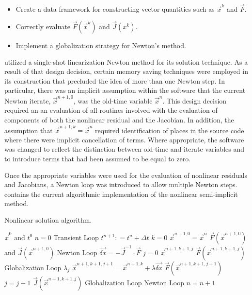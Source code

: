 \begin{itemize}
\item{Create a data framework for constructing vector quantities such as $\vec{x}^{k}$ and $\vec{F}$.}
\item{Correctly evaluate $\vec{F}(\vec{x}^{k})$ and $\vec{J}(x^{k})$.}
\item{Implement a globalization strategy for Newton's method.}
\end{itemize}

\cobra{} utilized a single-shot linearization Newton method for its solution technique.
As a result of that design decision, certain memory saving techniques were employed in its construction that precluded the idea of more than one Newton step.
In particular, there was an implicit assumption within the software that the current Newton iterate, $\vec{x}^{n+1, 0}$, was the old-time variable $\vec{x}^{n}$.
This design decision required an an evaluation of all routines involved with the evaluation of components of both the nonlinear residual and the Jacobian.
In addition, the assumption that $\vec{x}^{n+1, k} = \vec{x}^{n}$ required identification of places in the source code where there were implicit cancellation of terms.
Where appropriate, the software was changed to reflect the distinction between old-time and iterate variables and to introduce terms that had been assumed to be equal to zero.

Once the appropriate variables were used for the evaluation of nonlinear residuals and Jacobians, a Newton loop was introduced to allow multiple Newton steps.
 contains the current algorithmic implementation of the nonlinear semi-implicit method.

\begin{algo}[H]
\caption{Nonlinear \cobra{} solution algorithm.}
\label{alg:nl_cobra}
\setlength{\baselineskip}{0.625\baselineskip}
\begin{algorithmic}[1]
\Require $\vec{x}^{0}$ and $t^{0}$
\Set $n = 0$
\Loop \; Transient Loop
    \State $t^{n+1} : = t^{n} + \Delta t$
    \State $k = 0$
    \State $\vec{x}^{n+1,0} = \vec{x}^{n}$
	\Calculate $\vec{F}(\vec{x}^{n+1,0})$ and $\vec{J}(\vec{x}^{n+1,0})$
    \Loop \; Newton Loop
		\Calculate $\vec{\delta x} = - \vec{J}^{-1}\cdot\vec{F}$
		$j = 0$		
		\Calculate $\vec{x}^{n+1,k+1,j}$
		\Calculate $\vec{F}(\vec{x}^{n+1,k+1,j})$
		\Loop \; Globalization Loop
				\Calculate $\lambda_j$
				\Calculate $\vec{x}^{n+1,k+1,j+1} = \vec{x}^{n+1,k} + \lambda \vec{\delta x}$
				\Calculate $\vec{F}(\vec{x}^{n+1,k+1,j+1})$
				\State $j = j + 1$			
			\Else
				\Calculate $\vec{J}(\vec{x}^{n+1,k+1,j})$
				\Exit Globalization Loop
			\EndIf
		\EndLoop			
			\Exit Newton Loop
		\EndIf
	\EndLoop
	\State $n = n + 1$
\EndLoop
\end{algorithmic}
\end{algo}

